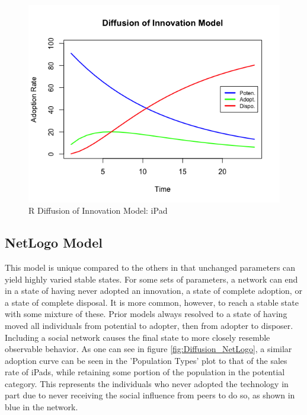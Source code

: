 \documentclass[11pt]{article}
\begin{document}
\begin{figure}[h!]
	\centering
	\includegraphics[width=0.7\linewidth]{Rplot02.png}
	\caption{R Diffusion of Innovation Model: iPad}
	\label{fig:Diffusion_graph_2}
\end{figure}



\subsection{NetLogo Model}

This model is unique compared to the others in that unchanged parameters can yield highly varied stable states. For some sets of parameters, a network can end in a state of having never adopted an innovation, a state of complete adoption, or a state of complete disposal. It is more common, however, to reach a stable state with some mixture of these. Prior models always resolved to a state of having moved all individuals from potential to adopter, then from adopter to disposer. Including a social network causes the final state to more closely resemble observable behavior. As one can see in figure \ref{fig:Diffusion_NetLogo}, a similar adoption curve can be seen in the 'Population Types' plot to that of the sales rate of iPads, while retaining some portion of the population in the potential category. This represents the individuals who never adopted the technology in part due to never receiving the social influence from peers to do so, as shown in blue in the network. 
\end{document}
